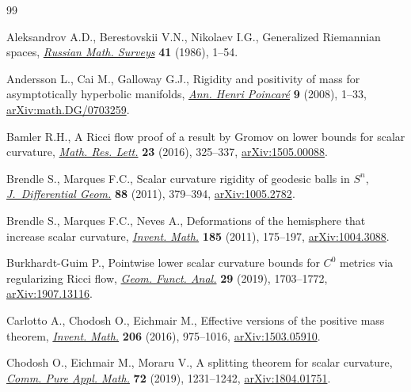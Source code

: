 \documentclass[10pt,a4paper]{amsart}
\numberwithin{equation}{section}
\theoremstyle{definition}
\begin{document}
\begin{thebibliography}{99}
\footnotesize\itemsep=0pt

Aleksandrov A.D., Berestovskii V.N., Nikolaev I.G., Generalized {R}iemannian
 spaces, \href{https://doi.org/10.1070/RM1986v041n03ABEH003311}{\textit{Russian Math. Surveys}} \textbf{41} (1986), 1--54.

Andersson L., Cai M., Galloway G.J., Rigidity and positivity of mass for
 asymptotically hyperbolic manifolds, \href{https://doi.org/10.1007/s00023-007-0348-2}{\textit{Ann. Henri Poincar\'e}}
 \textbf{9} (2008), 1--33, \href{https://arxiv.org/abs/math.DG/0703259}{arXiv:math.DG/0703259}.

Bamler R.H., A {R}icci flow proof of a result by {G}romov on lower bounds for
 scalar curvature, \href{https://doi.org/10.4310/MRL.2016.v23.n2.a2}{\textit{Math. Res. Lett.}} \textbf{23} (2016), 325--337,
 \href{https://arxiv.org/abs/1505.00088}{arXiv:1505.00088}.

Brendle S., Marques F.C., Scalar curvature rigidity of geodesic balls in
 {$S^n$}, \href{https://doi.org/10.4310/jdg/1321366355}{\textit{J.~Differential Geom.}} \textbf{88} (2011), 379--394,
 \href{https://arxiv.org/abs/1005.2782}{arXiv:1005.2782}.

Brendle S., Marques F.C., Neves A., Deformations of the hemisphere that
 increase scalar curvature, \href{https://doi.org/10.1007/s00222-010-0305-4}{\textit{Invent. Math.}} \textbf{185} (2011),
 175--197, \href{https://arxiv.org/abs/1004.3088}{arXiv:1004.3088}.

Burkhardt-Guim P., Pointwise lower scalar curvature bounds for {$C^0$} metrics
 via regularizing {R}icci flow, \href{https://doi.org/10.1007/s00039-019-00514-3}{\textit{Geom. Funct. Anal.}} \textbf{29}
 (2019), 1703--1772, \href{https://arxiv.org/abs/1907.13116}{arXiv:1907.13116}.

Carlotto A., Chodosh O., Eichmair M., Effective versions of the positive mass
 theorem, \href{https://doi.org/10.1007/s00222-016-0667-3}{\textit{Invent. Math.}} \textbf{206} (2016), 975--1016,
 \href{https://arxiv.org/abs/1503.05910}{arXiv:1503.05910}.

Chodosh O., Eichmair M., Moraru V., A splitting theorem for scalar curvature,
 \href{https://doi.org/10.1002/cpa.21803}{\textit{Comm. Pure Appl. Math.}} \textbf{72} (2019), 1231--1242,
 \href{https://arxiv.org/abs/1804.01751}{arXiv:1804.01751}.


\end{thebibliography}
\end{document}
